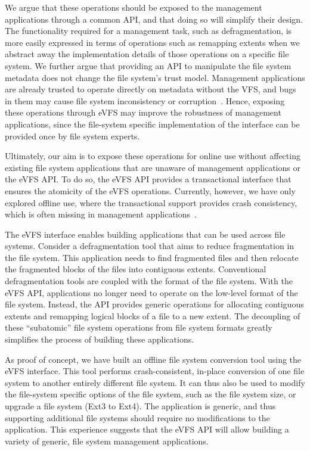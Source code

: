 We argue that these operations should be exposed to the management applications through a common API, and that doing so will simplify their design. The functionality required for a management task, such as defragmentation, is more easily expressed in terms of operations such as remapping extents when we abstract away the implementation details of those operations on a specific file system. We further argue that providing an API to manipulate the file system metadata does not change the file system's trust model. Management applications are already trusted to operate directly on metadata without the VFS, and bugs in them may cause file system inconsistency or corruption~\cite{Carreira2012,Gunawi08b}. Hence, exposing these operations through eVFS may improve the robustness of management applications, since the file-system specific implementation of the interface can be provided once by file system experts.

Ultimately, our aim is to expose these operations for online use without affecting existing file system applications that are unaware of management applications or the eVFS API. To do so, the eVFS API provides a transactional interface that ensures the atomicity of the eVFS operations. Currently, however, we have only explored offline use, where the transactional support provides crash consistency, which is often missing in management applications~\cite{gatla2018fsck}.

%
%
The eVFS interface enables building applications that can be used across file systems. Consider a defragmentation tool that aims to reduce fragmentation in the file system. This application needs to find fragmented files and then relocate the fragmented blocks of the files into contiguous extents. Conventional defragmentation tools are coupled with the format of the file system. With the eVFS API, applications no longer need to operate on the low-level format of the file system. Instead, the API provides generic operations for allocating contiguous extents and remapping logical blocks of a file to a new extent. The decoupling of these ``subatomic'' file system operations from file system formats greatly simplifies the process of building these applications.

As proof of concept, we have built an offline file system conversion tool using the eVFS interface. This tool performs crash-consistent, in-place conversion of one file system to another entirely different file system. It can thus also be used to modify the file-system specific options of the file system, such as the file system size, or upgrade a file system (Ext3 to Ext4). The application is generic, and thus supporting additional file systems should require no modifications to the application. This experience suggests that the eVFS API will allow building a variety of generic, file system management applications.

